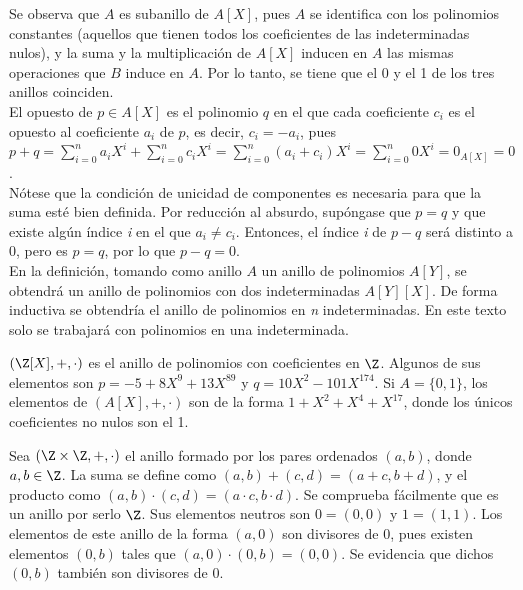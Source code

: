 \begin{TFGampliado}  
    \begin{obs}
        Se observa que $A$ es subanillo de $A[X]$, pues $A$ se identifica con los polinomios constantes (aquellos que tienen todos los coeficientes de las indeterminadas nulos), y la suma y la multiplicación de $A[X]$ inducen en $A$ las mismas operaciones que $B$ induce en $A$. Por lo tanto, se tiene que el 0 y el 1 de los tres anillos coinciden.\\
        El opuesto de $p\in A[X]$ es el polinomio $q$ en el que cada coeficiente $c_i$ es el opuesto al coeficiente $a_i$ de $p$, es decir, $c_i = -a_i$, pues $p + q = \sum\limits_{i=0}^{n} a_i X^i + \sum\limits_{i=0}^{n} c_i X^i = \sum\limits_{i=0}^{n} (a_i+c_i) X^i = \sum\limits_{i=0}^{n} 0 X^i = 0_{A[X]} = 0$.\\
        Nótese que la condición de unicidad de componentes es necesaria para que la suma esté bien definida. Por reducción al absurdo, supóngase que $p = q$ y que existe algún índice \textit{i} en el que $a_i \neq c_i$. Entonces, el índice \textit{i} de $p - q$ será distinto a 0, pero es $p = q$, por lo que $p - q = 0$.\\
        En la definición, tomando como anillo $A$ un anillo de polinomios $A[Y]$, se obtendrá un anillo de polinomios con dos indeterminadas $A[Y][X]$. De forma inductiva se obtendría el anillo de polinomios en \textit{n} indeterminadas. En este texto solo se trabajará con polinomios en una indeterminada.
    \end{obs}
    
    \begin{ej}
        $(\Z[X], +,\cdot)$ es el anillo de polinomios con coeficientes en $\Z$. Algunos de sus elementos son $p = -5 + 8X^9 + 13X^{89}$ y $q = 10X^2 - 101X^{174}$. Si $A = \{0,1\}$, los elementos de $(A[X], +,\cdot)$ son de la forma $1 + X^2 + X^{4} + X^{17}$, donde los únicos coeficientes no nulos son el 1.
    \end{ej}
\end{TFGampliado}

\begin{TFGampliado}
    \begin{ej}
     Sea $(\Z \times \Z, +,\cdot)$ el anillo formado por los pares ordenados $(a,b)$, donde $a,b \in \Z$. La suma se define como $ (a,b) + (c,d) = (a + c, b + d)$, y el producto como $ (a,b) \cdot (c,d) = (a \cdot c, b \cdot d)$. Se comprueba fácilmente que es un anillo por serlo $\Z$. Sus elementos neutros son $ 0 = (0,0)$ y $1 = (1,1)$. Los elementos de este anillo de la forma $(a,0)$ son divisores de 0, pues existen elementos $(0,b)$ tales que $(a,0) \cdot (0,b) = (0,0)$. Se evidencia que dichos $(0,b)$ también son divisores de 0.
    \end{ej}
\end{TFGampliado}

